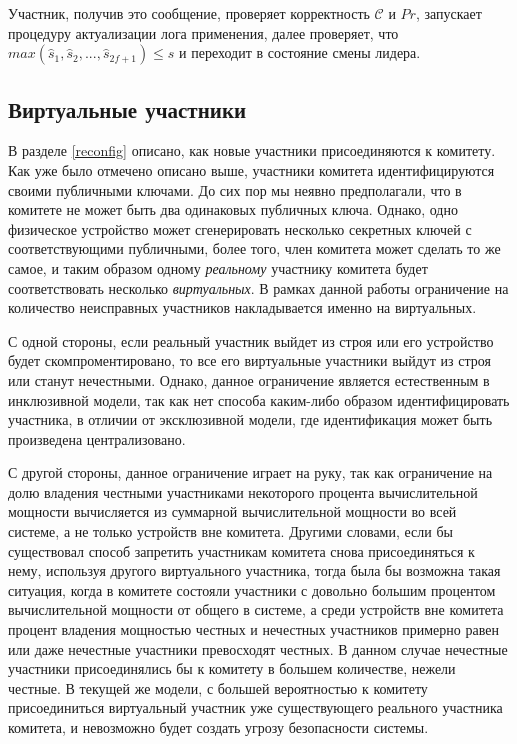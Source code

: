 Участник, получив это сообщение, проверяет корректность $\mathcal{C}$ и $Pr$, запускает процедуру актуализации лога применения, далее проверяет, что $max(\hat{s}_1,  \hat{s}_2,..., \hat{s}_{2f+1}) \le s$ и переходит в состояние смены лидера.

\subsection{Виртуальные участники}
В разделе \ref{reconfig} описано, как новые участники присоединяются к комитету. Как уже было отмечено описано выше, участники комитета идентифицируются своими публичными ключами. До сих пор мы неявно предполагали, что в комитете не может быть два одинаковых публичных ключа. Однако, одно физическое устройство может сгенерировать несколько секретных ключей с соответствующими публичными, более того, член комитета может сделать то же самое, и таким образом одному \textit{реальному} участнику комитета будет соответствовать несколько \textit{виртуальных}. В рамках данной работы ограничение на количество неисправных участников накладывается именно на виртуальных.

С одной стороны, если реальный участник выйдет из строя или его устройство будет скомпроментировано, то все его виртуальные участники выйдут из строя или станут нечестными.  Однако, данное ограничение является естественным в инклюзивной модели, так как нет способа каким-либо образом идентифицировать участника, в отличии от эксклюзивной модели, где идентификация может быть произведена централизовано.

С другой стороны, данное ограничение играет на руку, так как ограничение на долю владения честными участниками некоторого процента вычислительной мощности вычисляется из суммарной вычислительной мощности во всей системе, а не только устройств вне комитета. Другими словами, если бы существовал способ запретить участникам комитета снова присоединяться к нему, используя другого виртуального участника, тогда была бы возможна такая ситуация, когда в комитете состояли участники с довольно большим процентом вычислительной мощности от общего в системе, а среди устройств вне комитета процент владения мощностью честных и нечестных участников примерно равен или даже нечестные участники превосходят честных. В данном случае нечестные участники присоединялись бы к комитету в большем количестве, нежели честные. В текущей же модели, с большей вероятностью к комитету присоединиться виртуальный участник уже существующего реального участника комитета, и невозможно будет создать угрозу безопасности системы.

